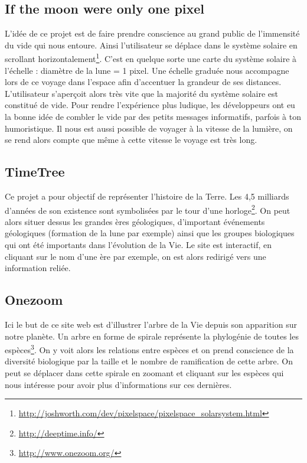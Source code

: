 \documentclass[a4paper]{article}
\begin{document}
	\subsection{If the moon were only one pixel}
		L’idée de ce projet est de faire prendre conscience au grand public de l'immensité du vide qui nous entoure. Ainsi l'utilisateur se déplace dans le système solaire en scrollant horizontalement\footnote{\url{http://joshworth.com/dev/pixelspace/pixelspace_solarsystem.html}}. C'est en quelque sorte une carte du système solaire à l'échelle : diamètre de la lune = 1 pixel. Une échelle graduée nous accompagne lors de ce voyage dans l'espace afin d'accentuer la grandeur de ses distances. L'utilisateur s’aperçoit alors très vite que la majorité du système solaire est constitué de vide. Pour rendre l'expérience plus ludique, les développeurs ont eu la bonne idée de combler le vide par des petits messages informatifs, parfois à ton humoristique. Il nous est aussi possible de voyager à la vitesse de la lumière, on se rend alors compte que même à cette vitesse le voyage est très long.         
 		
	\subsection{TimeTree}
		Ce projet a pour objectif de représenter l'histoire de la Terre. Les 4,5 milliards d'années de son existence sont symbolisées par le tour d'une horloge\footnote{\url{http://deeptime.info/}}. On peut alors situer dessus les grandes ères géologiques, d'important événements géologiques (formation de la lune par exemple) ainsi que les groupes biologiques qui ont été importants dans l'évolution de la Vie. Le site est interactif, en cliquant sur le nom d'une ère par exemple, on est alors redirigé vers une information reliée.      
	
	\subsection{Onezoom}
		Ici le but de ce site web est d'illustrer l'arbre de la Vie depuis son apparition sur notre planète. Un arbre en forme de spirale représente la phylogénie de toutes les espèces\footnote{\url{http://www.onezoom.org/}}. On y voit alors les relations entre espèces et on prend conscience de la diversité biologique par la taille et le nombre de ramification de cette arbre. On peut se déplacer dans cette spirale en zoomant et cliquant sur les espèces qui nous intéresse pour avoir plus d'informations sur ces dernières.    	
\end{document}
